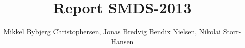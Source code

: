 \documentclass[]{report}
\title{Report SMDS-2013}
\author{Mikkel Bybjerg Christophersen, Jonas Bredvig Bendix Nielsen, Nikolai Storr-Hansen}
\begin{document}
\maketitle

\begin{abstract}
\end{abstract}











\appendix
\end{document}
